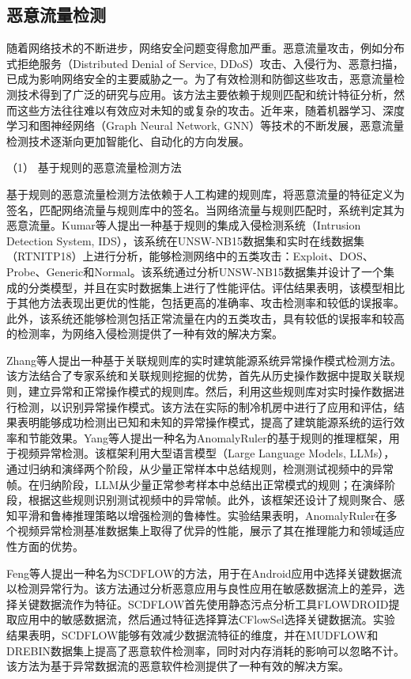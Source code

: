 \documentclass[promaster]{thesis-uestc}
\begin{document}
\subsection{恶意流量检测}


随着网络技术的不断进步，网络安全问题变得愈加严重。恶意流量攻击，例如分布式拒绝服务（Distributed Denial of Service, DDoS）攻击、入侵行为、恶意扫描，已成为影响网络安全的主要威胁之一。为了有效检测和防御这些攻击，恶意流量检测技术得到了广泛的研究与应用。该方法主要依赖于规则匹配和统计特征分析，然而这些方法往往难以有效应对未知的或复杂的攻击。近年来，随着机器学习、深度学习和图神经网络（Graph Neural Network, GNN）等技术的不断发展，恶意流量检测技术逐渐向更加智能化、自动化的方向发展。

（1） 基于规则的恶意流量检测方法

基于规则的恶意流量检测方法依赖于人工构建的规则库，将恶意流量的特征定义为签名，匹配网络流量与规则库中的签名。当网络流量与规则匹配时，系统判定其为恶意流量。Kumar等人提出一种基于规则的集成入侵检测系统（Intrusion Detection System, IDS），该系统在UNSW-NB15数据集和实时在线数据集（RTNITP18）上进行分析，能够检测网络中的五类攻击：Exploit、DOS、Probe、Generic和Normal。该系统通过分析UNSW-NB15数据集并设计了一个集成的分类模型，并且在实时数据集上进行了性能评估。评估结果表明，该模型相比于其他方法表现出更优的性能，包括更高的准确率、攻击检测率和较低的误报率。此外，该系统还能够检测包括正常流量在内的五类攻击，具有较低的误报率和较高的检测率，为网络入侵检测提供了一种有效的解决方案。

Zhang等人提出一种基于关联规则库的实时建筑能源系统异常操作模式检测方法。该方法结合了专家系统和关联规则挖掘的优势，首先从历史操作数据中提取关联规则，建立异常和正常操作模式的规则库。然后，利用这些规则库对实时操作数据进行检测，以识别异常操作模式。该方法在实际的制冷机房中进行了应用和评估，结果表明能够成功检测出已知和未知的异常操作模式，提高了建筑能源系统的运行效率和节能效果。Yang等人提出一种名为AnomalyRuler的基于规则的推理框架，用于视频异常检测。该框架利用大型语言模型（Large Language Models, LLMs），通过归纳和演绎两个阶段，从少量正常样本中总结规则，检测测试视频中的异常帧。在归纳阶段，LLM从少量正常参考样本中总结出正常模式的规则；在演绎阶段，根据这些规则识别测试视频中的异常帧。此外，该框架还设计了规则聚合、感知平滑和鲁棒推理策略以增强检测的鲁棒性。实验结果表明，AnomalyRuler在多个视频异常检测基准数据集上取得了优异的性能，展示了其在推理能力和领域适应性方面的优势。

Feng等人提出一种名为SCDFLOW的方法，用于在Android应用中选择关键数据流以检测异常行为。该方法通过分析恶意应用与良性应用在敏感数据流上的差异，选择关键数据流作为特征。SCDFLOW首先使用静态污点分析工具FLOWDROID提取应用中的敏感数据流，然后通过特征选择算法CFlowSel选择关键数据流。实验结果表明，SCDFLOW能够有效减少数据流特征的维度，并在MUDFLOW和DREBIN数据集上提高了恶意软件检测率，同时对内存消耗的影响可以忽略不计。该方法为基于异常数据流的恶意软件检测提供了一种有效的解决方案。
\end{document}
